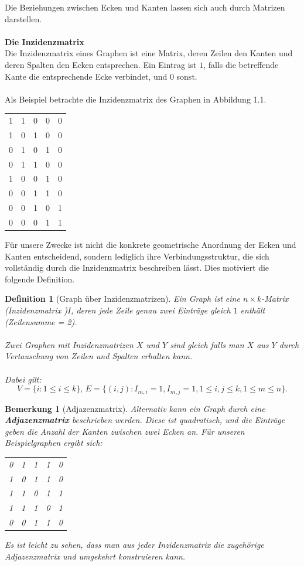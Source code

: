 \documentclass[11pt,a4paper,leqno]{report}
\newtheorem{definition}[theorem]{Definition}
\newtheorem{remark}[theorem]{Bemerkung}
\numberwithin{equation}{chapter}
\begin{document}
\noindent
Die Beziehungen zwischen Ecken und Kanten lassen sich auch durch Matrizen darstellen.
\\
\\
\textbf{Die Inzidenzmatrix}\\
Die Inzidenzmatrix eines Graphen ist eine Matrix, deren Zeilen den Kanten und deren Spalten den Ecken entsprechen. Ein Eintrag ist $1$, falls die betreffende Kante die entsprechende Ecke verbindet, und $0$ sonst.\\
\\
	Als Beispiel betrachte die Inzidenzmatrix des Graphen in Abbildung 1.1.
	\begin{center}
		\begin{tabular}{c c c c c}
			1 & 1 & 0 & 0 & 0\\
			1 & 0 & 1 & 0 & 0\\
			0 & 1 & 0 & 1 & 0\\
			0 & 1 & 1 & 0 & 0\\
			1 & 0 & 0 & 1 & 0\\
			0 & 0 & 1 & 1 & 0\\
			0 & 0 & 1 & 0 & 1\\
			0 & 0 & 0 & 1 & 1\\
		\end{tabular} 
	\end{center}
Für unsere Zwecke ist nicht die konkrete geometrische Anordnung der Ecken und Kanten entscheidend, sondern lediglich ihre Verbindungsstruktur, die sich vollständig durch die Inzidenzmatrix beschreiben lässt. Dies motiviert die folgende Definition.
\begin{definition}[Graph über Inzidenzmatrizen]
Ein Graph ist eine $n \times k$-Matrix (Inzidenzmatrix )$I$, deren jede Zeile genau zwei Einträge gleich $1$ enthält (Zeilensumme = 2).\\
\\
Zwei Graphen mit Inzidenzmatrizen $X$ und $Y$ sind gleich falls man $X$ aus $Y$ durch Vertauschung von Zeilen und Spalten erhalten kann.\\
\\
Dabei gilt:
 $$V=\{i: 1\leq i\leq k\}\text{, }E=\{(i,j):I_{m,i}=1,I_{m,j}=1,1\leq i,j\leq k,1\leq m\leq n\}.$$
\end{definition}
\begin{remark}[Adjazenzmatrix]
	Alternativ kann ein Graph durch eine \textbf{Adjazenzmatrix} beschrieben werden. Diese ist quadratisch, und die Einträge geben die Anzahl der Kanten zwischen zwei Ecken an.
    Für unseren Beispielgraphen ergibt sich:
	\begin{center}
	\begin{tabular}{c c c c c}
		0 & 1 & 1 & 1 & 0\\
		1 & 0 & 1 & 1 & 0\\
		1 & 1 & 0 & 1 & 1\\
		1 & 1 & 1 & 0 & 1\\
		0 & 0 & 1 & 1 & 0\\
	\end{tabular} 
\end{center}
Es ist leicht zu sehen, dass man aus jeder Inzidenzmatrix die zugehörige Adjazenzmatrix und umgekehrt konstruieren kann.
\end{remark}
\end{document}
